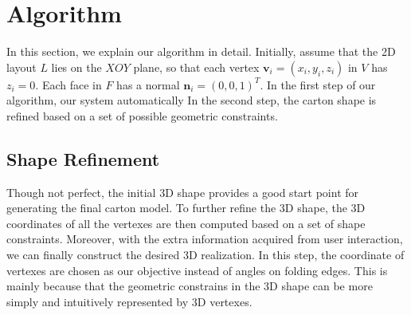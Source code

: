 \section{Algorithm}\label{sec:optimization}


In this section, we explain our algorithm in detail. 
Initially, assume that the 2D layout $L$ lies on the $XOY$ plane, so that each vertex $\mathbf{v}_i=(x_i,y_i,z_i)$ in $V$ has $z_i=0$. 
Each face in $F$ has a normal $\mathbf{n}_i=(0,0,1)^T$.
%
In the first step of our algorithm, our system automatically {\color{blue}{folds the original flat mesh into a rough model by assigning a specific angle to each fold edge.}}
In the second step, the carton shape is refined based on a set of possible geometric constraints.




\subsection{Shape Refinement}\label{sec:refinement}

Though not perfect, the initial 3D shape provides a good start point for generating the final carton model. 
%
To further refine the 3D shape, the 3D coordinates of all the vertexes are then computed based on a set of shape constraints.
%
Moreover, with the extra information acquired from user interaction, we can finally construct the desired 3D realization.
In this step, the coordinate of vertexes are chosen as our objective instead of angles on folding edges.
This is mainly because that the geometric constrains in the 3D shape can be more simply and intuitively represented by 3D vertexes.
 

